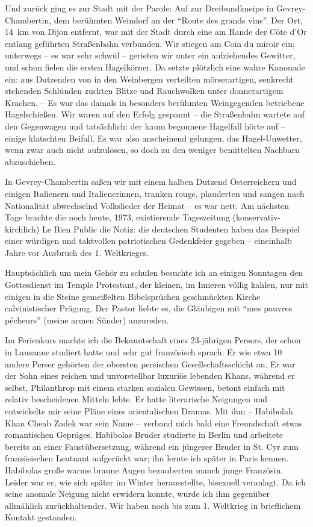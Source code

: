 \documentclass[a5paper,pagesize,10pt,twoside=true]{scrbook}
\begin{document}
Und zurück ging es zur Stadt mit der Parole: Auf zur Dreibundkneipe in Gevrey-Chambertin, dem berühmten Weindorf an der \enquote{Route des grands vins}. Der Ort, 14~km von Dijon entfernt, war mit der Stadt durch eine am Rande der Côte d'Or entlang geführten Straßenbahn verbunden. Wir stiegen am Coin du miroir ein; unterwegs -- es war sehr schwül -- gerieten wir unter ein aufziehendes Gewitter, und schon fielen die ersten Hagelkörner. Da setzte plötzlich eine wahre Kanonade ein: aus Dutzenden von in den Weinbergen verteilten mörserartigen, senkrecht stehenden Schlünden zuckten Blitze und Rauchwolken unter donnerartigem Krachen. -- Es war das damals in besonders berühmten Weingegenden betriebene Hagelschießen. Wir waren auf den Erfolg gespannt -- die Straßenbahn wartete auf den Gegenwagen und tatsächlich: der kaum begonnene Hagelfall hörte auf -- einige klatschten Beifall. Es war also anscheinend gelungen, das Hagel-Unwetter, wenn zwar auch nicht aufzulösen, so doch zu den weniger bemittelten Nachbarn abzuschieben.

In Gevrey-Chambertin saßen wir mit einem halben Dutzend Österreichern und einigen Italienern und Italienerinnen, tranken rouge, plauderten und sangen nach Nationalität abwechselnd Volkslieder der Heimat -- es war nett.
Am nächsten Tage brachte die noch heute, 1973, existierende Tageszeitung (konservativ-kirchlich) Le Bien Public die Notiz: die deutschen Studenten haben das Beispiel einer würdigen und taktvollen patriotischen Gedenkfeier gegeben -- eineinhalb Jahre vor Ausbruch des 1. Weltkrieges.

Hauptsächlich um mein Gehör zu schulen besuchte ich an einigen Sonntagen den Gottesdienst im Temple Protestant, der kleinen, im Inneren völlig kahlen, nur mit einigen in die Steine gemeißelten Bibelsprüchen geschmückten Kirche calvinistischer Prägung. Der Pastor liebte es, die Gläubigen mit \enquote{mes pauvres pécheurs} (meine armen Sünder) anzureden.

Im Ferienkurs machte ich die Bekanntschaft eines 23-jährigen Persers, der schon in Lausanne studiert hatte und sehr gut französisch sprach. Er wie etwa 10 andere Perser gehörten der obersten persischen Gesellschaftsschicht an. Er war der Sohn eines reichen und unvorstellbar luxuriös lebenden Khans, während er selbst, Philanthrop mit einem starken sozialen Gewissen, betont einfach mit relativ bescheidenen Mitteln lebte. Er hatte literarische Neigungen und entwickelte mir seine Pläne eines orientalischen Dramas. Mit ihm -- Habibolah Khan Cheab Zadek war sein Name -- verband mich bald eine Freundschaft etwas romantischen Gepräges. Habibolas Bruder studierte in Berlin und arbeitete bereits an einer Faustübersetzung, während ein jüngerer Bruder in St. Cyr zum französischen Leutnant aufgerückt war; ihn lernte ich später in Paris kennen. Habibolas große warme braune Augen bezauberten manch junge Französin. Leider war er, wie sich später im Winter herausstellte, bisexuell veranlagt. Da ich seine anomale Neigung nicht erwidern konnte, wurde ich ihm gegenüber allmählich zurückhaltender. Wir haben noch bis zum 1. Weltkrieg in brieflichem Kontakt gestanden.
\end{document}

